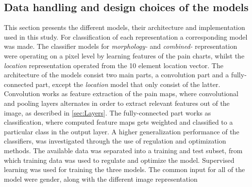\subsection{Data handling and design choices of the models}
This section presents the different models, their architecture and implementation used in this study.
For classification of each representation a corresponding model was made. The classifier models for \textit{morphology-} and \textit{combined-} representation were operating on a pixel level by learning features of the pain charts, whilst the \textit{location} representation operated from the 10 element location vector. 
The architecture of the models consist two main parts, a convolution part and a fully-connected part, except the \textit{location} model that only consist of the latter.   
Convolution works as feature extraction of the pain maps, where convolutional and pooling layers alternates in order to extract relevant features out of the image, as described in \autoref{sec:Layers}.
The fully-connected part works as classification, where computed feature maps gets weighted and classified to a particular class in the output layer. 
A higher generalization performance of the classifiers, was investigated through the use of regulation and optimization methods.
The available data was separated into a training and test subset, from which training data was used to regulate and optimize the model. 
Supervised learning was used for training the three models. The common input for all of the model were gender, along with the different image representation




